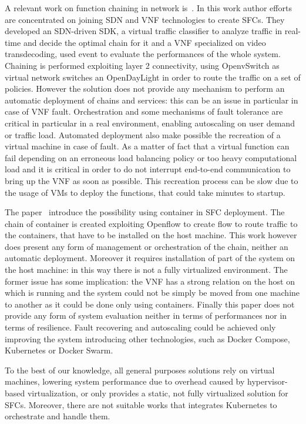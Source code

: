 A relevant work on function chaining in network is~\cite{trajkovska2017sdn}. In
this work author efforts are concentrated on joining SDN and VNF technologies to
create SFCs. They developed an SDN-driven SDK, a virtual traffic classifier to
analyze traffic in real-time and decide the optimal chain for it and a VNF
specialized on video transdecoding, used event to evaluate the performances of
the whole system. Chaining is performed exploiting layer 2 connectivity, using
OpenvSwitch as virtual network switches an OpenDayLight in order to route the
traffic on a set of policies. However the solution does not provide any
mechanism to perform an automatic deployment of chains and services: this can be
an issue in particular in case of VNF fault. Orchestration and some mechanisms
of fault tolerance are critical in particular in a real environment, enabling
autoscaling on user demand or traffic load. Automated deployment also make
possible the recreation of a virtual machine in case of fault. As a matter of
fact that a virtual function can fail depending on an erroneous load balancing
policy or too heavy computational load and it is critical in order to do not
interrupt end-to-end communication to bring up the VNF as soon as possible. This
recreation process can be slow due to the usage of VMs to deploy the functions,
that could take minutes to startup.

The paper~\cite{kriti2017dnfc} introduce the possibility using container in SFC
deployment. The chain of container is created exploiting Openflow to create flow
to route traffic to the containers, that have to be installed on the host
machine. This work however does present any form of management or orchestration
of the chain, neither an automatic deployment. Moreover it requires installation
of part of the system on the host machine: in this way there is not a fully
virtualized environment. The former issue has some implication: the VNF has a
strong relation on the host on which is running and the system could not be
simply be moved from one machine to another as it could be done only using
containers. Finally this paper does not provide any form of system evaluation
neither in terms of performances nor in terms of resilience. Fault recovering
and autoscaling could be achieved only improving the system introducing other
technologies, such as Docker Compose, Kubernetes or Docker Swarm.

To the best of our knowledge, all general purposes solutions rely on virtual
machines, lowering system performance due to overhead caused by hypervisor-based
virtualization, or only provides a static, not fully virtualized solution for
SFCs. Moreover, there are not suitable works that integrates Kubernetes to
orchestrate and handle them.

